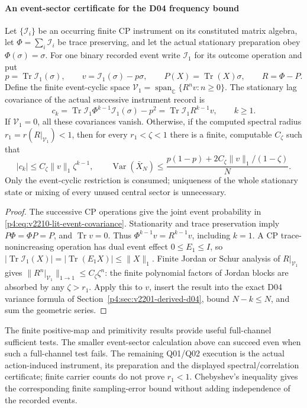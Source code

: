 \documentclass[12pt,a4paper]{article}
\begin{document}
\paragraph{An event-sector certificate for the D04 frequency bound}
\begin{theorem}
\label{p4:thm:v2210-lit-instrument-mixing}
Let $\{\mathcal I_i\}$ be an occurring finite CP instrument on its
constituted matrix algebra, let $\Phi=\sum_i\mathcal I_i$ be trace
preserving, and let the actual stationary preparation obey
$\Phi(\sigma)=\sigma$. For one binary recorded event write
$\mathcal I_1$ for its outcome operation and put
\[
 p=\operatorname{Tr}\mathcal I_1(\sigma),\qquad
 v=\mathcal I_1(\sigma)-p\sigma,\qquad
 P(X)=\operatorname{Tr}(X)\sigma,\qquad R=\Phi-P.
\]
Define the finite event-cyclic space
$\mathcal V_1=\operatorname{span}_{\mathbb C}\{R^nv:n\ge0\}$.
The stationary lag covariance of the actual successive instrument record is
\begin{equation}
 c_k=\operatorname{Tr}\mathcal I_1\Phi^{k-1}\mathcal I_1(\sigma)-p^2
 =\operatorname{Tr}\mathcal I_1 R^{k-1}v,\qquad k\ge1.
 \label{p4:eq:v2210-lit-event-covariance}
\end{equation}
If $\mathcal V_1=0$, all these covariances vanish. Otherwise, if the
computed spectral radius $r_1=r(R|_{\mathcal V_1})<1$, then for every
$r_1<\zeta<1$ there is a finite, computable $C_\zeta$ such that
\[
 |c_k|\le C_\zeta\|v\|_1\zeta^{k-1},\qquad
 \operatorname{Var}(\bar X_N)
 \le\frac{p(1-p)+2C_\zeta\|v\|_1/(1-\zeta)}N.
\]
Only the event-cyclic restriction is consumed; uniqueness of the whole
stationary state or mixing of every unused central sector is unnecessary.
\end{theorem}
\begin{proof}
The successive CP operations give the joint event probability in
\eqref{p4:eq:v2210-lit-event-covariance}. Stationarity and trace
preservation imply $P\Phi=\Phi P=P$, and $\operatorname{Tr}v=0$.
Thus $\Phi^{k-1}v=R^{k-1}v$, including $k=1$. A CP trace-nonincreasing
operation has dual event effect $0\le E_1\le I$, so
$|\operatorname{Tr}\mathcal I_1(X)|=|\operatorname{Tr}(E_1X)|\le\|X\|_1$.
Finite Jordan or Schur analysis of $R|_{\mathcal V_1}$ gives
$\|R^n|_{\mathcal V_1}\|_{1\to1}\le C_\zeta\zeta^n$: the finite
polynomial factors of Jordan blocks are absorbed by any $\zeta>r_1$.
Apply this to $v$, insert the result into the exact D04 variance formula
of Section~\ref{p4:sec:v2201-derived-d04}, bound $N-k\le N$, and sum
the geometric series.
\end{proof}
The finite positive-map and primitivity results
\cite{LitQFTEvansHoeghKrohn1978,LitQFTSanzWielandt2010} provide useful
full-channel sufficient tests. The smaller event-sector calculation above
can succeed even when such a full-channel test fails. The remaining Q01/Q02
execution is the actual action-induced instrument, its preparation and the
displayed spectral/correlation certificate; finite carrier counts do not
prove $r_1<1$. Chebyshev's inequality gives the corresponding finite
sampling-error bound without adding independence of the recorded events.
\end{document}
